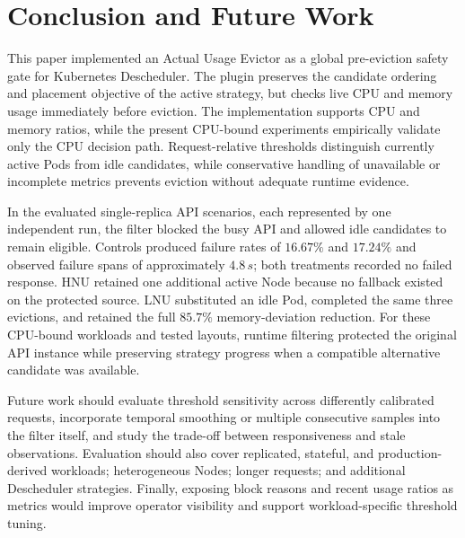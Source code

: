 \section{Conclusion and Future Work}
\label{sec:conclusion}

This paper implemented an Actual Usage Evictor as a global pre-eviction safety
gate for Kubernetes Descheduler. The plugin preserves the candidate ordering
and placement objective of the active strategy, but checks live CPU and memory
usage immediately before eviction. The implementation supports CPU and memory
ratios, while the present CPU-bound experiments empirically validate only the
CPU decision path. Request-relative thresholds distinguish currently active
Pods from idle candidates, while conservative handling of unavailable or
incomplete metrics prevents eviction without adequate runtime evidence.

In the evaluated single-replica API scenarios, each represented by one
independent run, the filter blocked the busy API and allowed idle candidates
to remain eligible. Controls produced failure rates of \(16.67\%\) and
\(17.24\%\) and observed failure spans of approximately \(4.8\,s\); both
treatments recorded no failed response. HNU retained one additional active
Node because no fallback existed on the protected source. LNU substituted an
idle Pod, completed the same three evictions, and retained the full \(85.7\%\)
memory-deviation reduction. For these CPU-bound workloads and tested layouts,
runtime filtering protected the original API instance while preserving
strategy progress when a compatible alternative candidate was available.

Future work should evaluate threshold sensitivity across differently
calibrated requests, incorporate temporal smoothing or multiple consecutive
samples into the filter itself, and study the trade-off between responsiveness
and stale observations. Evaluation should also cover replicated, stateful, and
production-derived workloads; heterogeneous Nodes; longer requests; and
additional Descheduler strategies. Finally, exposing block reasons and recent
usage ratios as metrics would improve operator visibility and support
workload-specific threshold tuning.
